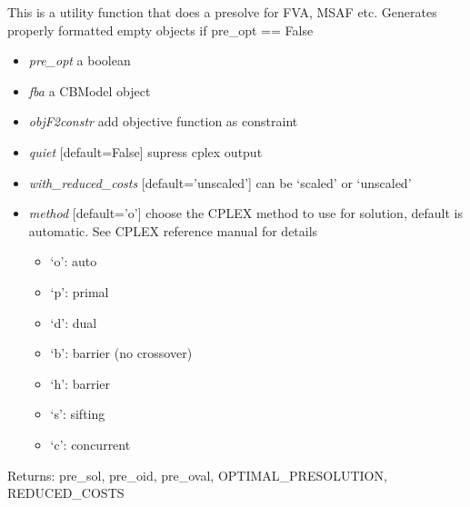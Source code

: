 \documentclass[a4paper,11pt,english]{sphinxmanual}
\begin{document}
\begin{fulllineitems}
\label{modules_doc:cbmpy.CBCPLEX.cplx_func_GetCPXandPresolve}
This is a utility function that does a presolve for FVA, MSAF etc. Generates properly formatted
empty objects if pre\_opt == False
\begin{itemize}
\item {} 
\emph{pre\_opt} a boolean

\item {} 
\emph{fba} a CBModel object

\item {} 
\emph{objF2constr} add objective function as constraint

\item {} 
\emph{quiet} {[}default=False{]} supress cplex output

\item {} 
\emph{with\_reduced\_costs} {[}default='unscaled'{]} can be `scaled' or `unscaled'

\item {} 
\emph{method} {[}default='o'{]} choose the CPLEX method to use for solution, default is automatic. See CPLEX reference manual for details
\begin{itemize}
\item {} 
`o': auto

\item {} 
`p': primal

\item {} 
`d': dual

\item {} 
`b': barrier (no crossover)

\item {} 
`h': barrier

\item {} 
`s': sifting

\item {} 
`c': concurrent

\end{itemize}

\end{itemize}

Returns: pre\_sol, pre\_oid, pre\_oval, OPTIMAL\_PRESOLUTION, REDUCED\_COSTS

\end{fulllineitems}
\end{document}
